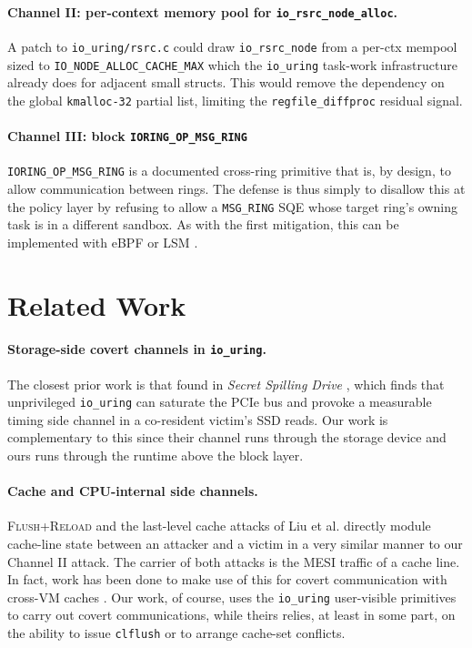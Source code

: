 \documentclass[letterpaper,twocolumn,10pt]{article}
\newcommand{\code}[1]{\texttt{#1}}
\newcommand{\iouring}{\texttt{io\_uring}\xspace}
\begin{document}
\paragraph{Channel II: per-context memory pool for \code{io\_rsrc\_node\_alloc}.} A patch to \code{io\_uring/rsrc.c} could draw \code{io\_rsrc\_node} from a per-ctx mempool sized to \code{IO\_NODE\_ALLOC\_CACHE\_MAX} which the \code{io\_uring} task-work infrastructure already does for adjacent small structs. This would remove the dependency on the global \code{kmalloc-32} partial list, limiting the \code{regfile\_diffproc} residual signal.

\paragraph{Channel III: block \code{IORING\_OP\_MSG\_RING}} \code{IORING\_OP\_MSG\_RING} is a documented cross-ring primitive that is, by design, to allow communication between rings. The defense is thus simply to disallow this at the policy layer by refusing to allow a \code{MSG\_RING} SQE whose target ring's owning task is in a different sandbox. As with the first mitigation, this can be implemented with eBPF or LSM \cite{he2023ringguard}.

\section{Related Work}
\paragraph{Storage-side covert channels in \code{io\_uring}.} The closest prior work is that found in \textit{Secret Spilling Drive} \cite{juffinger2025secret}, which finds that unprivileged \iouring can saturate the PCIe bus and provoke a measurable timing side channel in a co-resident victim's SSD reads. Our work is complementary to this since their channel runs through the storage device and ours runs through the runtime above the block layer. 

\paragraph{Cache and CPU-internal side channels.} \textsc{Flush+Reload} and the last-level cache attacks of Liu et al. \cite{yarom2014flushreload, liu2015lastlevel} directly module cache-line state between an attacker and a victim in a very similar manner to our Channel II attack. The carrier of both attacks is the MESI traffic of a cache line. In fact, work has been done to make use of this for covert communication with cross-VM caches \cite{maurice2017hello, ristenpart2009hey,wu2014whispers}. Our work, of course, uses the \iouring user-visible primitives to carry out covert communications, while theirs relies, at least in some part, on the ability to issue \code{clflush} or to arrange cache-set conflicts.
\end{document}
